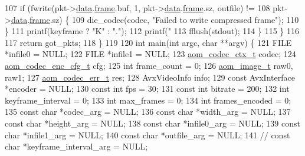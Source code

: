 \begin{DoxyCodeInclude}
{107       \textcolor{keywordflow}{if} (fwrite(pkt->\hyperlink{structaom__codec__cx__pkt_afb379cd4bfa7692d1d6e85f4e4b2b410}{data}.\hyperlink{structaom__codec__cx__pkt_a4180a6ae59b0d295bc915d4689df4cb0}{frame}.buf, 1, pkt->\hyperlink{structaom__codec__cx__pkt_afb379cd4bfa7692d1d6e85f4e4b2b410}{data}.\hyperlink{structaom__codec__cx__pkt_a4180a6ae59b0d295bc915d4689df4cb0}{frame}.sz, outfile) !=
108           pkt->\hyperlink{structaom__codec__cx__pkt_afb379cd4bfa7692d1d6e85f4e4b2b410}{data}.\hyperlink{structaom__codec__cx__pkt_a4180a6ae59b0d295bc915d4689df4cb0}{frame}.sz) \{
109         die\_codec(codec, \textcolor{stringliteral}{"Failed to write compressed frame"});
110       \}
111       printf(keyframe ? \textcolor{stringliteral}{"K"} : \textcolor{stringliteral}{"."});
112       printf(\textcolor{stringliteral}{" %
113       fflush(stdout);
114     \}
115   \}
116 
117   \textcolor{keywordflow}{return} got\_pkts;
118 \}
119 
120 \textcolor{keywordtype}{int} main(\textcolor{keywordtype}{int} argc, \textcolor{keywordtype}{char} **argv) \{
121   FILE *infile0 = NULL;
122   FILE *infile1 = NULL;
123   \hyperlink{structaom__codec__ctx}{aom\_codec\_ctx\_t} codec;
124   \hyperlink{structaom__codec__enc__cfg}{aom\_codec\_enc\_cfg\_t} cfg;
125   \textcolor{keywordtype}{int} frame\_count = 0;
126   \hyperlink{structaom__image}{aom\_image\_t} raw0, raw1;
127   \hyperlink{group__codec_gaaae61e0f8663e6137f1e228757248e7c}{aom\_codec\_err\_t} res;
128   AvxVideoInfo info;
129   \textcolor{keyword}{const} AvxInterface *encoder = NULL;
130   \textcolor{keyword}{const} \textcolor{keywordtype}{int} fps = 30;
131   \textcolor{keyword}{const} \textcolor{keywordtype}{int} bitrate = 200;
132   \textcolor{keywordtype}{int} keyframe\_interval = 0;
133   \textcolor{keywordtype}{int} max\_frames = 0;
134   \textcolor{keywordtype}{int} frames\_encoded = 0;
135   \textcolor{keyword}{const} \textcolor{keywordtype}{char} *codec\_arg = NULL;
136   \textcolor{keyword}{const} \textcolor{keywordtype}{char} *width\_arg = NULL;
137   \textcolor{keyword}{const} \textcolor{keywordtype}{char} *height\_arg = NULL;
138   \textcolor{keyword}{const} \textcolor{keywordtype}{char} *infile0\_arg = NULL;
139   \textcolor{keyword}{const} \textcolor{keywordtype}{char} *infile1\_arg = NULL;
140   \textcolor{keyword}{const} \textcolor{keywordtype}{char} *outfile\_arg = NULL;
141   \textcolor{comment}{//  const char *keyframe\_interval\_arg = NULL;}
}}
\end{DoxyCodeInclude}
